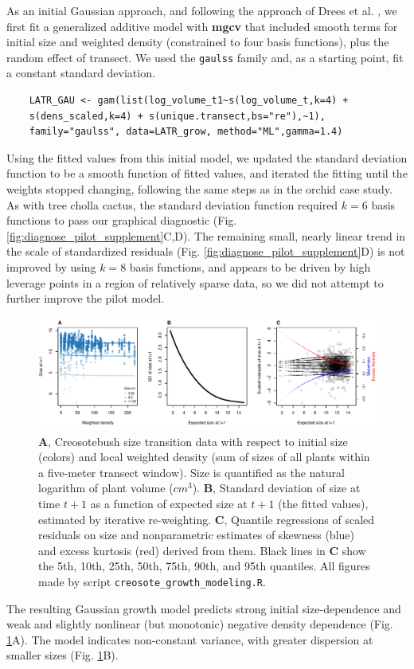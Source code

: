 \documentclass[12pt]{article}
\begin{document}
\begin{spacing}{1.35}
As an initial Gaussian approach, and following the approach of Drees et al. \citeyear{drees2023demography}, we first fit a generalized additive model with \textbf{mgcv} that included smooth terms for initial size and weighted density (constrained to four basis functions), plus the random effect of transect. 
We used the \texttt{gaulss} family and, as a starting point, fit a constant standard deviation. 
\begin{lstlisting}
	LATR_GAU <- gam(list(log_volume_t1~s(log_volume_t,k=4) + 
	s(dens_scaled,k=4) + s(unique.transect,bs="re"),~1), 
	family="gaulss", data=LATR_grow, method="ML",gamma=1.4) 
\end{lstlisting}
Using the fitted values from this initial model, we updated the standard deviation function to be a smooth function of fitted values, and iterated the fitting until the weights stopped changing, following the same steps as in the orchid case study. As
with tree cholla cactus, the standard deviation function required $k=6$ basis functions to pass our graphical 
diagnostic (Fig. \ref{fig:diagnose_pilot_supplement}C,D). The remaining small, nearly linear trend in the scale of
standardized residuals (Fig. \ref{fig:diagnose_pilot_supplement}D) is not improved by using $k=8$ basis functions, 
and appears to be driven by high leverage points in a region of relatively sparse data, so we did not attempt
to further improve the pilot model. 

\begin{figure}[tbp]
	\centering
	\includegraphics[width=1.0\textwidth]{figures/creosote_diagnostics.pdf}
	\caption{\textbf{A}, Creosotebush size transition data with respect to initial size (colors) and local weighted density (sum of sizes of all plants within a five-meter transect window). Size is quantified as the natural logarithm of plant volume ($cm^3$). \textbf{B}, Standard deviation of size at time $t+1$ as a function of expected size at $t+1$ (the fitted values), estimated by iterative re-weighting. \textbf{C}, Quantile regressions of scaled residuals on size and nonparametric estimates of skewness (blue) and excess kurtosis (red) derived from them. Black lines in \textbf{C} show the 5th, 10th, 25th, 50th, 75th, 90th, and 95th quantiles. All figures made by script \texttt{creosote\_growth\_modeling.R}.}
	\label{fig:creosote_diagnostics}
\end{figure} 
The resulting Gaussian growth model predicts strong initial size-dependence and weak and slightly nonlinear (but monotonic) negative density dependence (Fig. \ref{fig:creosote_diagnostics}A). 
The model indicates non-constant variance, with greater dispersion at smaller sizes (Fig. \ref{fig:creosote_diagnostics}B). 


\end{spacing}
\end{document}
